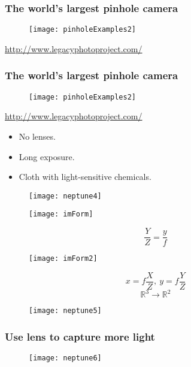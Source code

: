 \begin{frame}
\frametitle{The world's largest pinhole camera}
\begin{figure}[!h]
\centering
\texttt{[image: pinholeExamples2]}
\end{figure}
\url{http://www.legacyphotoproject.com/}
\end{frame}

\begin{frame}
\frametitle{The world's largest pinhole camera}
\begin{figure}[!h]
\centering
\texttt{[image: pinholeExamples2]}
\end{figure}
\url{http://www.legacyphotoproject.com/}
\begin{itemize}
\item No lenses.
\item Long exposure.
\item Cloth with light-sensitive chemicals.
\end{itemize}
\end{frame}

\begin{frame}
\begin{figure}[!h]
\centering
\texttt{[image: neptune4]}
\end{figure}
\end{frame}

\begin{frame}
\begin{figure}[!h]
\centering
\texttt{[image: imForm]}
\end{figure}
\[
\dfrac{Y}{Z} = \dfrac{y}{f}
\]
\end{frame}

\begin{frame}
\begin{figure}[!h]
\centering
\texttt{[image: imForm2]}
\end{figure}
\[
x=f\dfrac{X}{Z},\ y=f\dfrac{Y}{Z}
\]
\[
\mathbb{R}^{3} \rightarrow \mathbb{R}^{2}
\]
\end{frame}

\begin{frame}
\begin{figure}[!h]
\centering
\texttt{[image: neptune5]}
\end{figure}
\end{frame}

\begin{frame}
\frametitle{Use lens to capture more light}
\begin{figure}[!h]
\centering
\texttt{[image: neptune6]}
\end{figure}
\end{frame}

